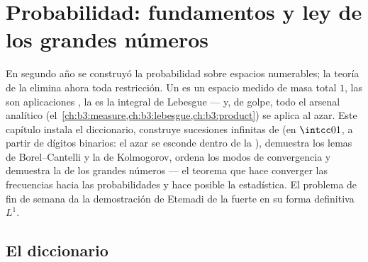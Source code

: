 \chapter{Probabilidad: fundamentos y ley de los grandes
números}\label{ch:b3:probability}

En segundo año se construyó la probabilidad sobre espacios numerables;
la teoría de la  elimina ahora
toda restricción. Un  es un espacio medido de
masa total $1$, las  son aplicaciones
, la
 es la integral de Lebesgue
--- y, de golpe, todo el arsenal analítico
(el~\cref{ch:b3:measure,ch:b3:lebesgue,ch:b3:product}) se aplica al
azar. Este capítulo instala el diccionario, construye sucesiones
infinitas de 
 (en $\intcc01$,
a partir de dígitos binarios: el azar se esconde dentro de la
), demuestra
los lemas de Borel--Cantelli y la
 de Kolmogorov, ordena
los modos de convergencia y demuestra la
 de los grandes números --- el
teorema que hace converger las frecuencias hacia las probabilidades y
hace posible la estadística. El problema de fin de semana da la
demostración de Etemadi de la 
fuerte en su forma definitiva $L^1$.

\section{El diccionario}


